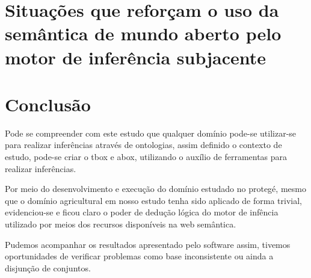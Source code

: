 \documentclass{article}
\begin{document}
\section{Situações que reforçam o uso da
semântica de mundo aberto pelo motor de inferência subjacente}



\newpage

\section{Conclusão}
    Pode se compreender com este estudo que qualquer domínio pode-se utilizar-se para realizar inferências através de ontologias, assim definido o contexto de estudo, pode-se criar o tbox e abox, utilizando o auxílio de ferramentas para realizar inferências.
    
    Por meio do desenvolvimento e execução do domínio estudado no protegé, mesmo que o domínio agricultural em nosso estudo tenha sido aplicado de forma trivial, evidenciou-se e ficou claro o poder de dedução lógica do motor de infência utilizado por meios dos recursos disponíveis na web semântica.
    
    
    Pudemos acompanhar os resultados apresentado pelo software assim, tivemos oportunidades de verificar problemas como base inconsistente ou ainda a disjunção de conjuntos.
\end{document}
